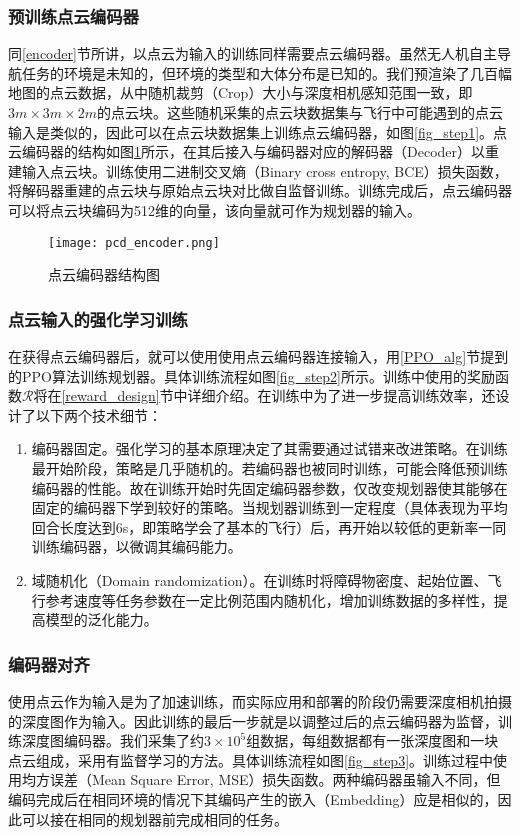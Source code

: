 \subsubsection{预训练点云编码器}
\label{pcd_encoder}
同\ref{encoder}节所讲，以点云为输入的训练同样需要点云编码器。虽然无人机自主导航任务的环境是未知的，但环境的类型和大体分布是已知的。我们预渲染了几百幅地图的点云数据，从中随机裁剪（Crop）大小与深度相机感知范围一致，即$3m\times 3m\times 2m$的点云块。这些随机采集的点云块数据集与飞行中可能遇到的点云输入是类似的，因此可以在点云块数据集上训练点云编码器，如图\ref{fig_step1}。点云编码器的结构如图\ref{fig_pcd_encoder}所示，在其后接入与编码器对应的解码器（Decoder）以重建输入点云块。训练使用二进制交叉熵（Binary cross entropy, BCE）损失函数，将解码器重建的点云块与原始点云块对比做自监督训练。训练完成后，点云编码器可以将点云块编码为512维的向量，该向量就可作为规划器的输入。

\begin{figure}
  \centering
  \texttt{[image: pcd\_encoder.png]}
  \caption{点云编码器结构图}
  \label{fig_pcd_encoder}
\end{figure}

\subsubsection{点云输入的强化学习训练}
\label{pcd_rl}
在获得点云编码器后，就可以使用使用点云编码器连接输入，用\ref{PPO_alg}节提到的PPO算法训练规划器。具体训练流程如图\ref{fig_step2}所示。训练中使用的奖励函数$\mathcal{R}$将在\ref{reward_design}节中详细介绍。在训练中为了进一步提高训练效率，还设计了以下两个技术细节：
\begin{enumerate}
  \item 编码器固定。强化学习的基本原理决定了其需要通过试错来改进策略。在训练最开始阶段，策略是几乎随机的。若编码器也被同时训练，可能会降低预训练编码器的性能。故在训练开始时先固定编码器参数，仅改变规划器使其能够在固定的编码器下学到较好的策略。当规划器训练到一定程度（具体表现为平均回合长度达到6s，即策略学会了基本的飞行）后，再开始以较低的更新率一同训练编码器，以微调其编码能力。
  \item 域随机化（Domain randomization）。在训练时将障碍物密度、起始位置、飞行参考速度等任务参数在一定比例范围内随机化，增加训练数据的多样性，提高模型的泛化能力。
\end{enumerate}

\subsubsection{编码器对齐}
\label{encoder_align}
使用点云作为输入是为了加速训练，而实际应用和部署的阶段仍需要深度相机拍摄的深度图作为输入。因此训练的最后一步就是以调整过后的点云编码器为监督，训练深度图编码器。我们采集了约$3\times 10^5$组数据，每组数据都有一张深度图和一块点云组成，采用有监督学习的方法。具体训练流程如图\ref{fig_step3}。训练过程中使用均方误差（Mean Square Error, MSE）损失函数。两种编码器虽输入不同，但编码完成后在相同环境的情况下其编码产生的嵌入（Embedding）应是相似的，因此可以接在相同的规划器前完成相同的任务。

